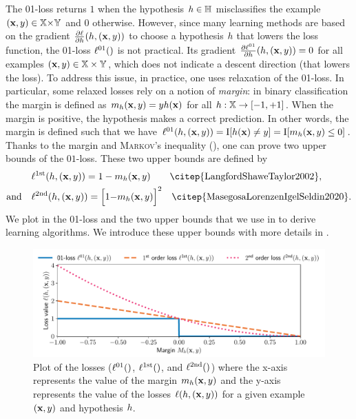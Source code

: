 The 01-loss returns $1$ when the hypothesis $h\in\mathbb{H}$ misclassifies the example $(\mathbf{x},y)\in\mathbb{X}{\times}\mathbb{Y}$ and $0$ otherwise.
However, since many learning methods are based on the gradient $\frac{\partial\ell}{\partial h}(h ,(\mathbf{x},y))$ to choose a hypothesis $h$ that lowers the loss function, the 01-loss $\ell^{01}()$ is not practical.
Its gradient $\frac{\partial\ell^{01}}{\partial h}(h ,(\mathbf{x},y))=0$ for all examples $(\mathbf{x},y)\in\mathbb{X}\times\mathbb{Y}$, which does not indicate a descent direction (that lowers the loss).
To address this issue, in practice, one uses relaxation of the 01-loss.
In particular, some relaxed losses rely on a notion of {\it margin}: in binary classification the margin is defined as $m_{h}(\mathbf{x},y)=yh(\mathbf{x})$ for all $h:\mathbb{X}\to[-1,+1]$.
When the margin is positive, the hypothesis makes a correct prediction.
In other words, the margin is defined such that we have $\ell^{01}(h, (\mathbf{x},y))=\operatorname{I}[h(\mathbf{x})\ne y]=\operatorname{I}[m_{h}(\mathbf{x},y) \le 0]$.
Thanks to the margin and \textsc{Markov}'s inequality (), one can prove two upper bounds of the $01$-loss.
These two upper bounds are defined by
\begin{align*}
    &\lossFirst(\h, (\x,\y)) = 1-\Mah(\x,\y)\quad\quad \text{\citep{LangfordShaweTaylor2002}},\\
    \text{and}\quad &\lossSnd(\h, (\x,\y)) = \Big[1{-}\Mah(\x,\y)\Big]^2\quad \text{\citep{MasegosaLorenzenIgelSeldin2020}}.
\end{align*}
We plot in  the 01-loss and the two upper bounds that we use in  to derive learning algorithms.
We introduce these upper bounds with more details in .

\begin{figure}[H]
    \centering
    \includegraphics[width=1.0\textwidth]{chapter_1/figures/losses.pdf}
    \caption[Plot of Different Losses]{Plot of the losses ($\ell^{01}()$, $\ell^{\text{1st}}()$, and $\ell^{\text{2nd}}()$) where the x-axis represents the value of the margin $m_{h}(\mathbf{x}, y)$ and the y-axis represents the value of the losses $\ell(h, (\mathbf{x},y))$ for a given example $(\mathbf{x},y)$ and hypothesis $h$.}
    \label{chap:intro:fig:loss}
\end{figure}

